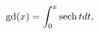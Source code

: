 \[\mathop{\mathrm{gd}\/}\nolimits\!\left(x\right)=\int_{0}^{x}\mathop{\mathrm{%
sech}\/}\nolimits tdt,\]